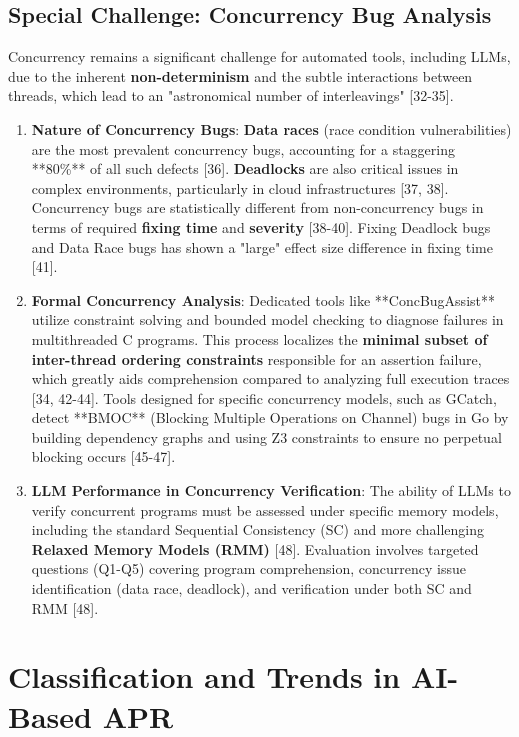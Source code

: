 \subsection{Special Challenge: Concurrency Bug Analysis}
\label{ssec:concurrency}

Concurrency remains a significant challenge for automated tools, including LLMs, due to the inherent \textbf{non-determinism} and the subtle interactions between threads, which lead to an "astronomical number of interleavings" [32-35].

\begin{enumerate}
    \item \textbf{Nature of Concurrency Bugs}:
    \textbf{Data races} (race condition vulnerabilities) are the most prevalent concurrency bugs, accounting for a staggering **80\%** of all such defects [36]. \textbf{Deadlocks} are also critical issues in complex environments, particularly in cloud infrastructures [37, 38]. Concurrency bugs are statistically different from non-concurrency bugs in terms of required \textbf{fixing time} and \textbf{severity} [38-40]. Fixing Deadlock bugs and Data Race bugs has shown a "large" effect size difference in fixing time [41].

    \item \textbf{Formal Concurrency Analysis}:
    Dedicated tools like **ConcBugAssist** utilize constraint solving and bounded model checking to diagnose failures in multithreaded C programs. This process localizes the \textbf{minimal subset of inter-thread ordering constraints} responsible for an assertion failure, which greatly aids comprehension compared to analyzing full execution traces [34, 42-44]. Tools designed for specific concurrency models, such as GCatch, detect **BMOC** (Blocking Multiple Operations on Channel) bugs in Go by building dependency graphs and using Z3 constraints to ensure no perpetual blocking occurs [45-47].

    \item \textbf{LLM Performance in Concurrency Verification}:
    The ability of LLMs to verify concurrent programs must be assessed under specific memory models, including the standard Sequential Consistency (SC) and more challenging \textbf{Relaxed Memory Models (RMM)} [48]. Evaluation involves targeted questions (Q1-Q5) covering program comprehension, concurrency issue identification (data race, deadlock), and verification under both SC and RMM [48].
\end{enumerate}

\section{Classification and Trends in AI-Based APR}

